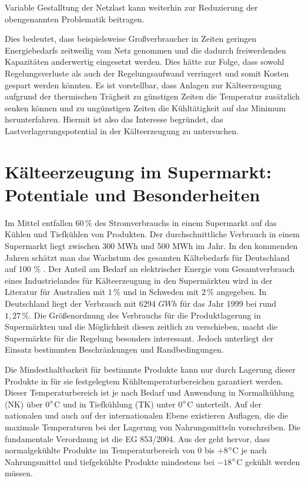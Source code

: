 Variable Gestalltung der Netzlast kann weiterhin zur Reduzierung der
obengenannten Problematik beitragen.

Dies bedeutet, dass beispielsweise Gro\ss verbraucher in Zeiten geringen
Energiebedarfs zeitweilig vom Netz genommen und die dadurch freiwerdenden
Kapazit\"aten anderwertig eingesetzt werden. Dies h\"atte zur Folge, dass sowohl
Regelungsverluste als auch der Regelungsaufwand verringert und somit Kosten
gespart werden k\"onnten. Es ist vorstellbar, dass Anlagen zur K\"alteerzeugung
aufgrund der thermischen Tr\"agheit zu g\"unstigen Zeiten die Temperatur
zus\"atzlich senken k\"onnen und zu ung\"unstigen Zeiten die K\"uhlt\"atigkeit
auf das Minimum herunterfahren. Hiermit ist also das Interesse begr\"undet, das
Lastverlagerungspotential in der K\"alteerzeugung zu untersuchen.


\section{K\"alteerzeugung im Supermarkt: Potentiale und Besonderheiten}

Im Mittel entfallen $60\,\%$\cite{leghart, EANRW} des Stromverbrauchs in einem
Supermarkt auf das Kühlen und Tiefkühlen von Produkten. Der durchschnittliche
Verbrauch in einem Supermarkt liegt zwischen 300 MWh und 500 MWh im
Jahr\cite{leghart}. In den kommenden Jahren sch\"atzt man das Wachstum des
gesamten K\"altebedarfs f\"ur Deutschland auf 100 \% \cite{probst}. Der Anteil
am Bedarf an elektrischer Energie vom Gesamtverbrauch eines Industrielandes für
Kälteerzeugung in den Supermärkten wird in der Literatur f\"ur  Australien mit
$1\, \%$ \cite{australia} und in Schweden mit $2\, \%$ \cite{doctor, EANRW}
angegeben. In Deutschland liegt der Verbrauch mit 6294 $GWh$ f\"ur das
Jahr 1999 bei rund $1,27\, \%$\cite{steilme}. Die Gr\"o\ss enordnung des
Verbrauchs f\"ur die Produktlagerung in Superm\"arkten und die M\"oglichkeit
diesen zeitlich zu verschieben, macht die Superm\"arkte f\"ur die Regelung
besonders interessant. Jedoch unterliegt der Einsatz bestimmten Beschr\"ankungen
und Randbedingungen.

Die Mindesthaltbarkeit f\"ur bestimmte Produkte kann nur durch Lagerung
dieser Produkte in f\"ur sie festgelegtem K\"uhltemperaturbereichen garantiert
werden. Dieser Temperaturbereich ist je nach Bedarf und Anwendung in
Normalk\"uhlung (NK) über 0$^\circ$C und in
Tiefk\"uhlung (TK) unter 0$^\circ$C unterteilt. Auf der
nationalen und auch auf der internationalen Ebene existieren Auflagen, die die
maximale Temperaturen bei der Lagerung von Nahrungsmitteln vorschreiben. Die
fundamentale Verordnung ist die EG 853/2004. Aus der geht hervor, dass
normalgekühlte Produkte im Temperaturbereich von 0 bis $+8$$^\circ$C je nach
Nahrungsmittel und tiefgekühlte Produkte mindestens bei $-18$$^\circ$C gekühlt
werden müssen.

